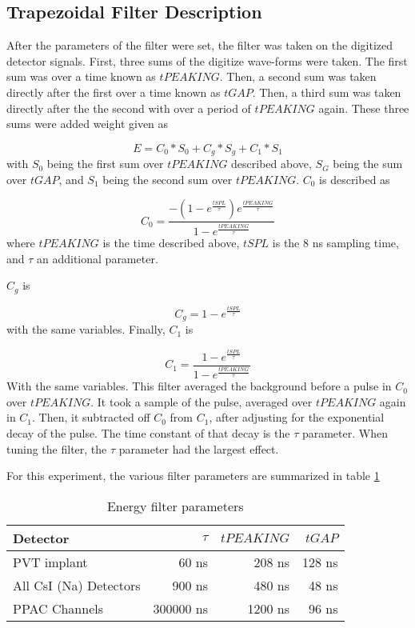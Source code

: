 \documentclass[../MaxHughesThesis.tex]{subfiles}
\begin{document}
\subsection{Trapezoidal Filter Description}
After the parameters of the filter were set, the filter was taken on the digitized detector signals.
First, three sums of the digitize wave-forms were taken.
The first sum was over a time known as $tPEAKING$.
Then, a second sum was taken directly after the first over a time known as $tGAP$.
Then, a third sum was taken directly after the the second with over a period of $tPEAKING$ again.
These three sums were added weight given as  

\begin{equation}
	E = C_{0} * S_{0} + C_{g} * S_{g} + C_{1} * S_{1} 
	\label{eq:ensum}
\end{equation} 
%
with $S_{0}$ being the first sum over $tPEAKING$ described above, $S_{G}$ being the sum over $tGAP$, and $S_{1}$ being the second sum over $tPEAKING$.
$C_{0}$ is described as

\begin{equation}
	C_{0} = \frac{-(1 - e^{\frac{tSPL}{\tau}})e^{\frac{tPEAKING}{\tau}}}{1 - e^{\frac{tPEAKING}{\tau}}}
	\label{eq:c0sum}
\end{equation}
%
where $tPEAKING$ is the time described above, $tSPL$ is the 8 ns sampling time, and $\tau$ an additional parameter.

$C_{g}$ is 

\begin{equation}
	C_{g} = 1 - e^{\frac{tSPL}{\tau}}
	\label{eq:cgsum}
\end{equation}
%
with the same variables.
Finally, $C_{1}$ is 

\begin{equation}
	C_{1} = \frac{1 - e^{\frac{tSPL}{\tau}}}{1 - e^{\frac{tPEAKING}{\tau}}}
	\label{eq:c1sum}
\end{equation}
%
With the same variables.
This filter averaged the background before a pulse in $C_{0}$ over $tPEAKING$.
It took a sample of the pulse, averaged over $tPEAKING$ again in $C_{1}$.
Then, it subtracted off $C_{0}$ from $C_{1}$, after adjusting for the exponential decay of the pulse.
The time constant of that decay is the $\tau$ parameter.
When tuning the filter, the $\tau$ parameter had the largest effect.

For this experiment, the various filter parameters are summarized in table \ref{tab:pixieparams}  
%
\begin{table}[!hbt]
	\centering
	\caption{Energy filter parameters}
			\begin{tabular}{lrrr}
			Detector & $\tau$ & $tPEAKING$ & $tGAP$ \\ \hline
			PVT implant & 60 ns & 208 ns & 128 ns \\
			All CsI (Na) Detectors & 900 ns & 480 ns & 48 ns \\
			PPAC Channels & 300000 ns & 1200 ns & 96 ns  
			\end{tabular}	
			\label{tab:pixieparams}
\end{table}
%
\end{document}
